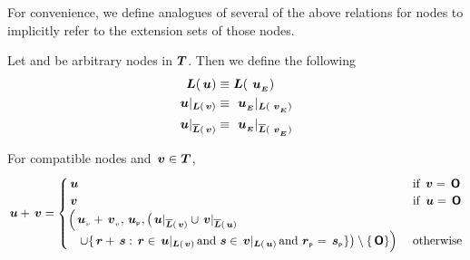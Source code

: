 \begin{definition}\label{useful-node-functions}
  For convenience, we define analogues of several of the above
  relations for nodes to implicitly refer to the extension sets of
  those nodes.

  Let  and  be arbitrary nodes in $\DOM$.  Then we
  define the following
  \begin{align*}
      \nlabels{u} &\equiv \nlabels{\extn{u}}\\
      \restrictedto{u}{v} &\equiv \restrictedto{\extn{u}}{\extn{v}}\\
      \nrestrictedto{u}{v} &\equiv \nrestrictedto{\extn{u}}{\extn{v}}
  \end{align*}
\end{definition}

\begin{definition}
  \label{treeaddition}
  For compatible nodes  and \(\node{v} \in \DOM\), 
  \begin{align*}
      \node{u} + \node{v} = \begin{cases}
        \node{u} &\text{ if } \node{v} = \zerotree \\
        \node{v} &\text{ if } \node{u} = \zerotree \\
        \Bigl(\nv{u} + \nv{v}, \nlabel{u}, 
        \bigl(\nrestrictedto{u}{v}\cup\nrestrictedto{v}{u} & {} \\
        \quad\cup\{\node{r}+\node{s}:\node{r}\in\restrictedto{u}{v}\mand\node{s}\in\restrictedto{v}{u}\mand\nlabel{r}=\nlabel{s}\}\bigr)\setminus \{\zerotree\}\Bigr) & \text{ otherwise}
      \end{cases}
  \end{align*}
\end{definition}

